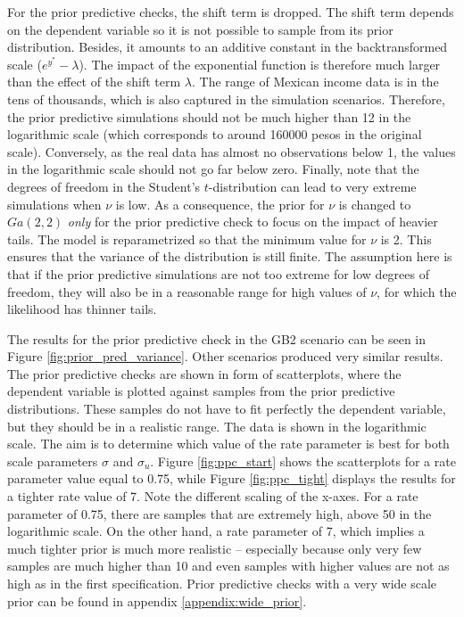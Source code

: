 For the prior predictive checks, the shift term is dropped.
The shift term depends on the dependent variable so it is not possible to sample from its prior distribution.
Besides, it amounts to an additive constant in the backtransformed scale ($e^{y^*} - \lambda$). The impact of the exponential function is therefore much larger than the effect of the shift term $\lambda$.
The range of Mexican income data is in the tens of thousands, which is also captured in the simulation scenarios.
Therefore, the prior predictive simulations should not be much higher than 12 in the logarithmic scale (which corresponds to around 160000 pesos in the original scale).
Conversely, as the real data has almost no observations below 1, the values in the logarithmic scale should not go far below zero.
Finally, note that the degrees of freedom in the Student's $t$-distribution can lead to very extreme simulations when $\nu$ is low.
As a consequence, the prior for $\nu$ is changed to $Ga(2, 2)$ \textit{only} for the prior predictive check to focus on the impact of heavier tails.
The model is reparametrized so that the minimum value for $\nu$ is 2. This ensures that the variance of the distribution is still finite.
The assumption here is that if the prior predictive simulations are not too extreme for low degrees of freedom, they will also be in a reasonable range for high values of $\nu$, for which the likelihood has thinner tails.


The results for the prior predictive check in the GB2 scenario can be seen in Figure \ref{fig:prior_pred_variance}.
Other scenarios produced very similar results.
The prior predictive checks are shown in form of scatterplots, where the dependent variable is plotted against samples from the prior predictive distributions.
These samples do not have to fit perfectly the dependent variable, but they should be in a realistic range.
The data is shown in the logarithmic scale.
The aim is to determine which value of the rate parameter is best for both scale parameters $\sigma$ and $\sigma_u$.
Figure \ref{fig:ppc_start} shows the scatterplots for a rate parameter value equal to 0.75, while Figure \ref{fig:ppc_tight} displays the results for a tighter rate value of 7.
Note the different scaling of the x-axes.
For a rate parameter of 0.75, there are samples that are extremely high, above 50 in the logarithmic scale.
On the other hand, a rate parameter of 7, which implies a much tighter prior is much more realistic – especially because only very few samples are much higher than 10 and even samples with higher values are not as high as in the first specification.
Prior predictive checks with a very wide scale prior can be found in appendix \ref{appendix:wide_prior}.

